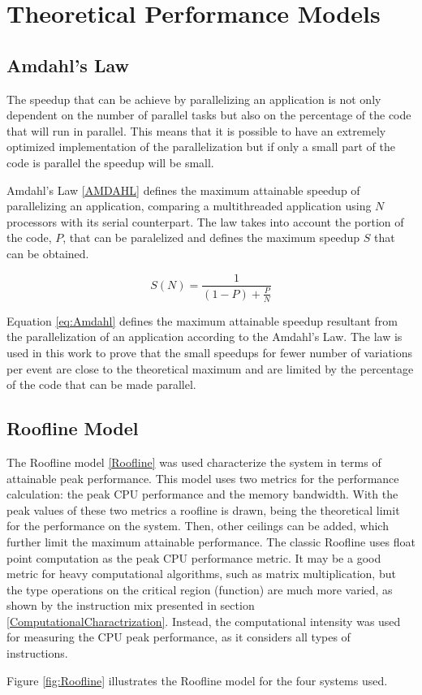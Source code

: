 \appendix
{}
\chapter{Theoretical Performance Models}

\section{Amdahl's Law}
\label{AmdahlsLaw}

The speedup that can be achieve by parallelizing an application is not only dependent on the number of parallel tasks but also on the percentage of the code that will run in parallel. This means that it is possible to have an extremely optimized implementation of the parallelization but if only a small part of the code is parallel the speedup will be small.

Amdahl's Law \ref{AMDAHL} defines the maximum attainable speedup of parallelizing an application, comparing a multithreaded application using $N$ processors with its serial counterpart. The law takes into account the portion of the code, $P$, that can be paralelized and defines the maximum speedup $S$ that can be obtained.

\begin{center}
	\begin{equation}
		S(N) = \frac{1}{(1 - P) + \frac{P}{N}}
		\label{eq:Amdahl}
	\end{equation}
\end{center}

Equation \ref{eq:Amdahl} defines the maximum attainable speedup resultant from the parallelization of an application according to the Amdahl's Law. The law is used in this work to prove that the small speedups for fewer number of variations per event are close to the theoretical maximum and are limited by the percentage of the code that can be made parallel.

\section{Roofline Model}
\label{App:Roofline}

The Roofline model \ref{Roofline} was used characterize the system in terms of attainable peak performance. This model uses two metrics for the performance calculation: the peak CPU performance and the memory bandwidth. With the peak values of these two metrics a roofline is drawn, being the theoretical limit for the performance on the system. Then, other ceilings can be added, which further limit the maximum attainable performance. The classic Roofline uses float point computation as the peak CPU performance metric. It may be a good metric for heavy computational algorithms, such as matrix multiplication, but the type operations on the critical region (\ttDilepKinFit function) are much more varied, as shown by the instruction mix presented in section \ref{ComputationalCharactrization}. Instead, the computational intensity was used for measuring the CPU peak performance, as it considers all types of instructions.

Figure \ref{fig:Roofline} illustrates the Roofline model for the four systems used.

